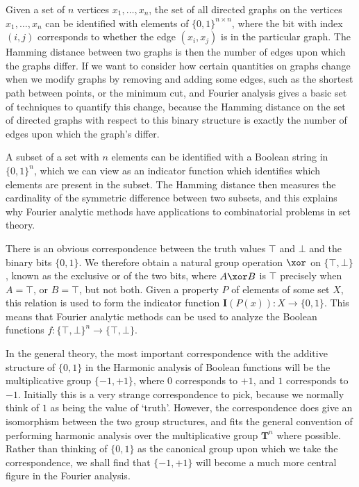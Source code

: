 \begin{example}
    Given a set of $n$ vertices $x_1, \dots, x_n$, the set of all directed graphs on the vertices $x_1, \dots, x_n$ can be identified with elements of $\{ 0, 1 \}^{n \times n}$, where the bit with index $(i,j)$ corresponds to whether the edge $(x_i, x_j)$ is in the particular graph. The Hamming distance between two graphs is then the number of edges upon which the graphs differ. If we want to consider how certain quantities on graphs change when we modify graphs by removing and adding some edges, such as the shortest path between points, or the minimum cut, and Fourier analysis gives a basic set of techniques to quantify this change, because the Hamming distance on the set of directed graphs with respect to this binary structure is exactly the number of edges upon which the graph's differ.
\end{example}

\begin{example}
    A subset of a set with $n$ elements can be identified with a Boolean string in $\{ 0, 1 \}^n$, which we can view as an indicator function which identifies which elements are present in the subset. The Hamming distance then measures the cardinality of the symmetric difference between two subsets, and this explains why Fourier analytic methods have applications to combinatorial problems in set theory.
\end{example}

\begin{example}
    There is an obvious correspondence between the truth values $\top$ and $\bot$ and the binary bits $\{ 0, 1 \}$. We therefore obtain a natural group operation $\xor$ on $\{ \top, \bot \}$, known as the exclusive or of the two bits, where $A \xor B$ is $\top$ precisely when $A = \top$, or $B = \top$, but not both. Given a property $P$ of elements of some set $X$, this relation is used to form the indicator function $\mathbf{I}(P(x)): X \to \{ 0, 1 \}$. This means that Fourier analytic methods can be used to analyze the Boolean functions $f: \{ \top, \bot \}^n \to \{ \top, \bot \}$.
\end{example}

In the general theory, the most important correspondence with the additive structure of $\{ 0, 1 \}$ in the Harmonic analysis of Boolean functions will be the multiplicative group $\{ -1, +1 \}$, where 0 corresponds to $+1$, and $1$ corresponds to $-1$. Initially this is a very strange correspondence to pick, because we normally think of $1$ as being the value of `truth'. However, the correspondence does give an isomorphism between the two group structures, and fits the general convention of performing harmonic analysis over the multiplicative group $\mathbf{T}^n$ where possible. Rather than thinking of $\{ 0, 1 \}$ as the canonical group upon which we take the correspondence, we shall find that $\{ -1, +1 \}$ will become a much more central figure in the Fourier analysis.

